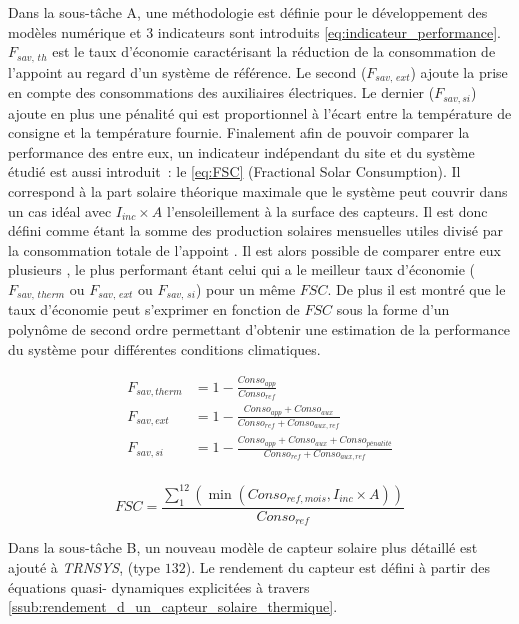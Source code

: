 Dans la sous-tâche A, une méthodologie est définie pour le développement des modèles
numérique et $3$ indicateurs sont introduits \eqref{eq:indicateur_performance}. $F_{sav,\,th}$ est le taux d’économie
caractérisant la réduction de la
consommation de l’appoint au regard d’un système de référence. Le second ($F_{sav,\,ext}$) ajoute
la prise en compte des consommations des auxiliaires électriques. Le dernier ($F_{sav, si}$) ajoute en
plus une pénalité qui est proportionnel à l’écart entre la température de consigne et la température
fournie.
Finalement afin de pouvoir comparer la performance des  entre eux, un indicateur
indépendant du site et du système étudié est aussi introduit~: le  \eqref{eq:FSC} (Fractional Solar Consumption).
Il correspond à la part solaire théorique maximale que le système peut couvrir dans un cas idéal avec $I_{inc} \times A$
l’ensoleillement à la surface des capteurs. Il est donc défini comme étant la somme des production solaires mensuelles
utiles divisé par la consommation totale de l’appoint \parencite{Letz2009}. Il est alors possible
de comparer entre eux plusieurs , le plus performant étant celui qui a le meilleur taux d’économie
($F_{sav,\,therm}$ ou $F_{sav,\,ext}$ ou $F_{sav,\,si}$) pour un même $FSC$. De plus il est montré
que le taux d’économie peut s’exprimer en fonction de $FSC$ sous la forme d’un polynôme de second ordre
permettant d’obtenir une estimation de la performance du système pour différentes conditions climatiques.

\begin{subequations}\label{eq:indicateur_performance}
    \begin{align}
        F_{sav, therm} &= 1 - \frac{Conso_{app}}{Conso_{ref}}                        \\[10pt]
        F_{sav, ext}   &= 1 - \frac{Conso_{app} + Conso_{aux}}{Conso_{ref} + Conso_{aux, ref}}  \\[10pt]
        F_{sav, si}    &= 1 - \frac{Conso_{app} + Conso_{aux} + Conso_{pénalité}}{Conso_{ref} + Conso_{aux, ref}}  \\[10pt]
    \end{align}
\end{subequations}

\begin{equation}\label{eq:FSC}
        FSC = \frac{\sum_{1}^{12} \left( \min(Conso_{ref, mois}, I_{inc} \times A) \right)}{Conso_{ref}}
\end{equation}

Dans la sous-tâche B, un nouveau modèle de capteur solaire plus détaillé est ajouté à \textit{TRNSYS}, (type
$132$). Le rendement du capteur est défini à partir des équations quasi-
dynamiques explicitées à travers \ref{ssub:rendement_d_un_capteur_solaire_thermique}.

